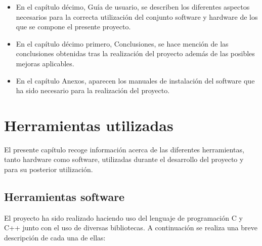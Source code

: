 \documentclass[a4paper,12pt]{article}
\begin{document}
\begin{itemize}
\item En el capítulo décimo, Guía de usuario, se describen los diferentes aspectos necesarios para la correcta utilización del conjunto software y hardware de los que se compone el presente proyecto.

\item En el capítulo décimo primero, Conclusiones, se hace mención de las conclusiones obtenidas tras la realización del proyecto además de las posibles mejoras aplicables.

\item En el capítulo Anexos, aparecen los manuales de instalación del software que ha sido necesario para la realización del proyecto.

\end{itemize}


\section{Herramientas utilizadas}

El presente capítulo recoge información acerca de las diferentes herramientas, tanto hardware como software, utilizadas durante el desarrollo del proyecto y para su posterior utilización. 

\subsection {Herramientas software}

El proyecto ha sido realizado haciendo uso del lenguaje de programación C y C++ junto con el uso de diversas bibliotecas. A continuación se realiza una breve descripción de cada una de ellas:
\end{document}
